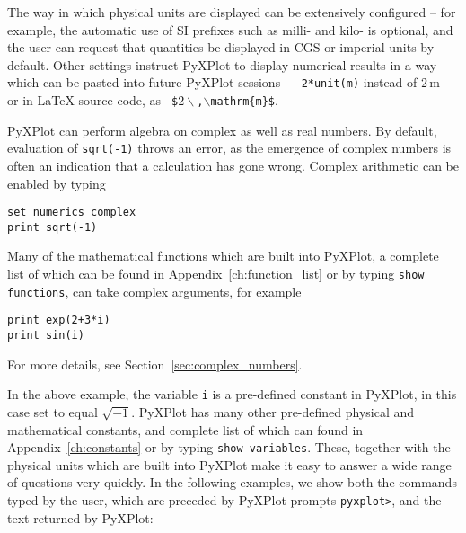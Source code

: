 The way in which physical units are displayed can be extensively configured --
for example, the automatic use of SI prefixes such as milli- and kilo- is
optional, and the user can request that quantities be displayed in CGS or
imperial units by default. Other settings instruct PyXPlot to display numerical
results in a way which can be pasted into future PyXPlot sessions -- {\tt
2*unit(m)} instead of $2\,\mathrm{m}$ -- or in LaTeX source code, as {\tt
\$$2\backslash$,$\backslash$mathrm\{m\}\$}.

PyXPlot can perform algebra on complex as well as real numbers. By default,
evaluation of {\tt sqrt(-1)} throws an error, as the emergence of complex
numbers is often an indication that a calculation has gone wrong.  Complex
arithmetic can be enabled by typing

\begin{verbatim}
set numerics complex
print sqrt(-1)
\end{verbatim}

\noindent Many of the mathematical functions which are built into PyXPlot, a
complete list of which can be found in Appendix~\ref{ch:function_list} or by
typing {\tt show functions}, can take complex arguments, for example

\begin{verbatim}
print exp(2+3*i)
print sin(i)
\end{verbatim}

\noindent For more details, see Section~\ref{sec:complex_numbers}.

In the above example, the variable {\tt i} is a pre-defined constant in
PyXPlot, in this case set to equal $\sqrt{-1}$. PyXPlot has many other
pre-defined physical and mathematical constants, and complete list of which can
found in Appendix~\ref{ch:constants} or by typing {\tt show variables}. These,
together with the physical units which are built into PyXPlot make it easy to
answer a wide range of questions very quickly.  In the following examples, we
show both the commands typed by the user, which are preceded by PyXPlot prompts
{\tt pyxplot>}, and the text returned by PyXPlot:

